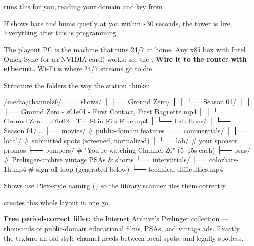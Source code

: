 \documentclass[fontpath=fonts/,logopath=logo/]{riposte-doc}
\begin{document}
\ripmarker{}   runs this for you, reading your domain and key from .

If  shows bars and hums quietly at you within \textasciitilde{}30 seconds, the tower is live. Everything after this is programming.



The playout PC is the machine that runs 24/7 at home. Any x86 box with Intel Quick Sync (or an NVIDIA card) works; see the . \textbf{Wire it to the router with ethernet.} Wi-Fi is where 24/7 streams go to die.



Structure the folders the way the station thinks:

\ripcodeopen
{}
\begin{ripcodeblock}
/media/channelz0/
├── shows/
│   ├── Ground Zero/
│   │   └── Season 01/
│   │       ├── Ground Zero - s01e01 - First Contact, First Baguette.mp4
│   │       └── Ground Zero - s01e02 - The Skin Fits Fine.mp4
│   └── Lab Hour/
│       └── Season 01/...
├── movies/                  # public-domain features
├── commercials/
│   ├── local/               # submitted spots (screened, normalized)
│   └── lab/                 # your sponsor promos
├── bumpers/                 # "You're watching Channel Z0" (5–15s each)
├── psas/                    # Prelinger-archive vintage PSAs & shorts
└── interstitials/
    ├── colorbars-1h.mp4     # sign-off loop (generated below)
    └── technical-difficulties.mp4
\end{ripcodeblock}
\ripcodesizereset\ripcodeclose

Shows use Plex-style naming () so the library scanner files them correctly.

\ripmarker{}   creates this whole layout in one go.

\textbf{Free period-correct filler:} the Internet Archive's \href{https://archive.org/details/prelinger}{Prelinger collection} — thousands of public-domain educational films, PSAs, and vintage ads. Exactly the texture an old-style channel needs between local spots, and legally spotless.
\end{document}
